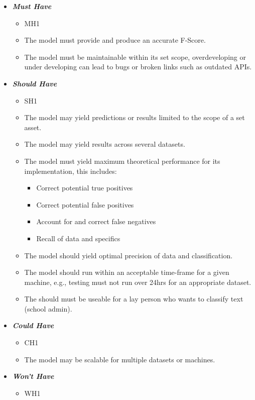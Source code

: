 \begin{itemize}
    \item \textbf{\textit{Must Have}}
        \begin{itemize}\label{NFMH}
            \item MH1
            \item The model must provide and produce an accurate F-Score.
            \item The model must be maintainable within its set scope, overdeveloping or under developing can lead to bugs or broken links such as outdated APIs.
        \end{itemize}
    \item \textbf{\textit{Should Have}}
        \begin{itemize}\label{NFSH}
            \item SH1
            \item The model may yield predictions or results limited to the scope of a set asset.
            \item The model may yield results across several datasets.
            \item The model must yield maximum theoretical performance for its implementation, this includes:
                \begin{itemize}
                    \item Correct potential true positives
                    \item Correct potential false positives
                    \item Account for and correct false negatives
                    \item Recall of data and specifics
                \end{itemize}
            \item The model should yield optimal precision of data and classification.
            \item The model should run within an acceptable time-frame for a given machine, e.g., testing must not run over 24hrs for an appropriate dataset.
            \item The should must be useable for a lay person who wants to classify text (school admin).
        \end{itemize}
    \item \textbf{\textit{Could Have}}
        \begin{itemize}\label{NFCH}
            \item CH1
            \item The model may be scalable for multiple datasets or machines.
        \end{itemize}
    \item \textbf{\textit{Won't Have}}
        \begin{itemize}\label{NFWH}
            \item WH1
        \end{itemize}
\end{itemize}

